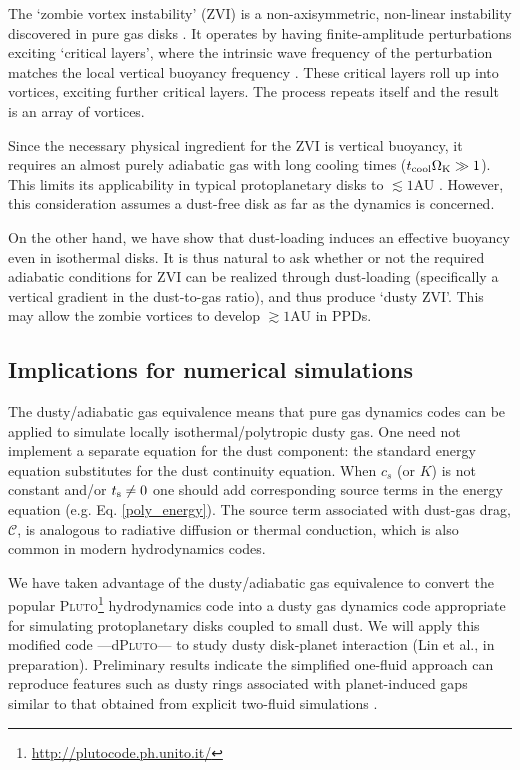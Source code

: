 The `zombie vortex instability' (ZVI) is a non-axisymmetric,
non-linear instability discovered in pure gas disks
\citep{marcus15,umurhan16d}. It operates by having finite-amplitude perturbations
exciting `critical layers',  where the intrinsic wave frequency of the
perturbation matches the local vertical buoyancy frequency 
\citep{marcus13}. These critical layers roll 
up into vortices, exciting further critical layers. The process
repeats itself and the result is an array of vortices. 

Since the necessary physical ingredient for the ZVI is vertical
buoyancy, it requires an almost purely adiabatic gas with long cooling times ($t_\mathrm{cool}\Omega_{\rm K}\gg
1$). This limits its applicability in typical protoplanetary disks to 
$\lesssim 1$AU \citep{lesur16, malygin17}. However, this consideration
assumes a dust-free disk as far as the dynamics is concerned. 

On the other hand, we have show that dust-loading induces an effective
buoyancy even in isothermal disks. It is thus natural to ask whether or not
the required adiabatic conditions for ZVI can be realized through
dust-loading (specifically a vertical gradient in the dust-to-gas ratio), 
and thus produce `dusty ZVI'. This may allow the zombie 
vortices to develop $\gtrsim 1$AU in PPDs. 

\subsection{Implications for numerical simulations}
The dusty/adiabatic gas equivalence means that pure
gas dynamics codes can be applied to simulate locally
isothermal/polytropic dusty gas. One need not implement a separate 
equation for the dust component: 
 the standard energy equation substitutes for the dust continuity
equation. When $c_s$ (or $K$) is not constant and/or $t_\mathrm{s}\neq0$ one
should add corresponding source terms in the energy equation
(e.g. Eq. \ref{poly_energy}). 
The source term associated with dust-gas drag, $\mathcal{C}$, is 
analogous to radiative diffusion \citep{price15} or thermal
conduction, which is also common in modern hydrodynamics codes.       

We have taken advantage of the dusty/adiabatic gas equivalence to 
convert the popular
\textsc{Pluto}\footnote{\url{http://plutocode.ph.unito.it/}}      
hydrodynamics code \citep{mignone07} into a dusty gas dynamics code appropriate for
simulating protoplanetary disks coupled to small dust. We will apply 
this modified code ---d\textsc{Pluto}--- to study dusty disk-planet interaction (Lin et al., 
in preparation). Preliminary results indicate the simplified one-fluid 
approach can reproduce features such as dusty rings associated with 
planet-induced gaps similar to that obtained from explicit two-fluid
simulations \citep[e.g.][]{dong17}. 

